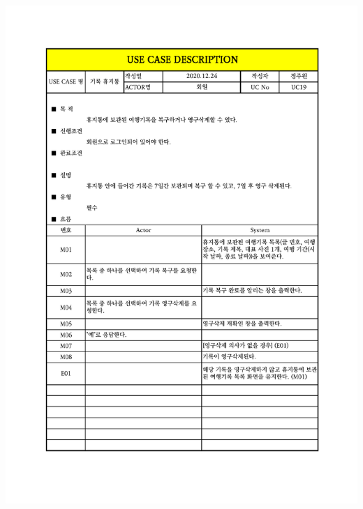 {{{{{{{{{{{{{{{{{{{{{\includegraphics[width=1.1\textwidth]{./Figure/Design/Display/usecase/019.pdf} \\
}}}}}}}}}}}}}}}}}}}}}
